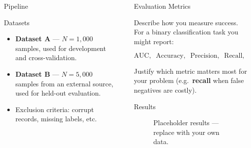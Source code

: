 \documentclass[final]{beamer}
\newlength{\sepwidth}
\newlength{\colwidth}
\newcommand{\separatorcolumn}{\begin{column}{\sepwidth}\end{column}}
\begin{document}
\begin{frame}[t]
\begin{columns}[t]
\begin{column}{\colwidth}
\begin{block}{Pipeline}
  \end{block}

  \begin{block}{Datasets}

    \begin{itemize}
      \item \textbf{Dataset A} --- $N{=}1{,}000$ samples, used for
        development and cross-validation.
      \item \textbf{Dataset B} --- $N{=}5{,}000$ samples from an
        external source, used for held-out evaluation.
      \item Exclusion criteria: corrupt records, missing labels, etc.
    \end{itemize}

  \end{block}

\end{column}

\separatorcolumn

\begin{column}{\colwidth}

  \begin{block}{Evaluation Metrics}

    Describe how you measure success.  For a binary classification
    task you might report:

    $$
      \text{AUC}, \;\; \text{Accuracy}, \;\; \text{Precision}, \;\;
      \text{Recall}, \;\; F_1
    $$

    Justify which metric matters most for your problem (e.g.\
    \textbf{recall} when false negatives are costly).

  \end{block}

  \begin{block}{Results}

    \begin{figure}
      \centering
      \caption{Placeholder results --- replace with your own data.}
    \end{figure}


\end{block}
\end{column}
\end{columns}
\end{frame}
\end{document}
